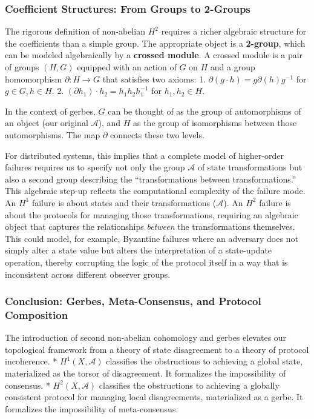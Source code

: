 \documentclass[
]{article}
\begin{document}
\subsubsection{Coefficient Structures: From Groups to
2-Groups}\label{coefficient-structures-from-groups-to-2-groups}

The rigorous definition of non-abelian \(H^2\) requires a richer
algebraic structure for the coefficients than a simple group. The
appropriate object is a \textbf{2-group}, which can be modeled
algebraically by a \textbf{crossed module}. A crossed module is a pair
of groups \((H, G)\) equipped with an action of \(G\) on \(H\) and a
group homomorphism \(\partial: H \to G\) that satisfies two axioms: 1.
\(\partial(g \cdot h) = g \partial(h) g^{-1}\) for \(g \in G, h \in H\).
2. \((\partial h_1) \cdot h_2 = h_1 h_2 h_1^{-1}\) for
\(h_1, h_2 \in H\).

In the context of gerbes, \(G\) can be thought of as the group of
automorphisms of an object (our original \(\mathcal{A}\)), and \(H\) as
the group of isomorphisms between those automorphisms. The map
\(\partial\) connects these two levels.

For distributed systems, this implies that a complete model of
higher-order failures requires us to specify not only the group
\(\mathcal{A}\) of state transformations but also a second group
describing the ``transformations between transformations.'' This
algebraic step-up reflects the computational complexity of the failure
mode. An \(H^1\) failure is about states and their transformations
(\(\mathcal{A}\)). An \(H^2\) failure is about the protocols for
managing those transformations, requiring an algebraic object that
captures the relationships \emph{between} the transformations
themselves. This could model, for example, Byzantine failures where an
adversary does not simply alter a state value but alters the
interpretation of a state-update operation, thereby corrupting the logic
of the protocol itself in a way that is inconsistent across different
observer groups.

\subsubsection{Conclusion: Gerbes, Meta-Consensus, and Protocol
Composition}\label{conclusion-gerbes-meta-consensus-and-protocol-composition}

The introduction of second non-abelian cohomology and gerbes elevates
our topological framework from a theory of state disagreement to a
theory of protocol incoherence. * \textbf{\(H^1(X, \mathcal{A})\)}
classifies the obstructions to achieving a global state, materialized as
the torsor of disagreement. It formalizes the impossibility of
consensus. * \textbf{\(H^2(X, \mathcal{A})\)} classifies the
obstructions to achieving a globally consistent protocol for managing
local disagreements, materialized as a gerbe. It formalizes the
impossibility of meta-consensus.
\end{document}
